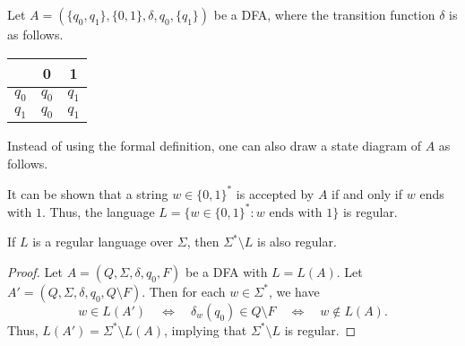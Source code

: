 \begin{example}
  Let $A = (\{q_0, q_1\}, \{0, 1\}, \delta, q_0, \{q_1\})$ be a DFA, where the
  transition function $\delta$ is as follows.
  \begin{center}
    \begin{tabular}{c|cc}
      & 0 & 1 \\
      \hline
      $q_0$ & $q_0$ & $q_1$ \\
      $q_1$ & $q_0$ & $q_1$
    \end{tabular}
  \end{center}
  Instead of using the formal definition, one can also draw a state diagram of
  $A$ as follows.
  \begin{center}
  \end{center}
  It can be shown that a string $w \in \{0, 1\}^*$ is accepted by $A$ if and
  only if $w$ ends with $1$.
  Thus, the language $L = \{w \in \{0, 1\}^* : \text{$w$ ends with 1} \}$
  is regular.
\end{example}

\begin{theorem}
  If $L$ is a regular language over $\Sigma$, then $\Sigma^* \setminus L$
  is also regular.
\end{theorem}
\begin{proof}
  Let $A = (Q, \Sigma, \delta, q_0, F)$ be a DFA with $L = L(A)$.
  Let $A' = (Q, \Sigma, \delta, q_0, Q \setminus F)$.
  Then for each $w \in \Sigma^*$, we have
  \begin{equation*}
    w \in L(A')
    \quad \Leftrightarrow \quad \delta_w(q_0) \in Q \setminus F
    \quad \Leftrightarrow \quad w \notin L(A).
  \end{equation*}
  Thus, $L(A') = \Sigma^* \setminus L(A)$, implying that $\Sigma^* \setminus L$
  is regular.
\end{proof}

